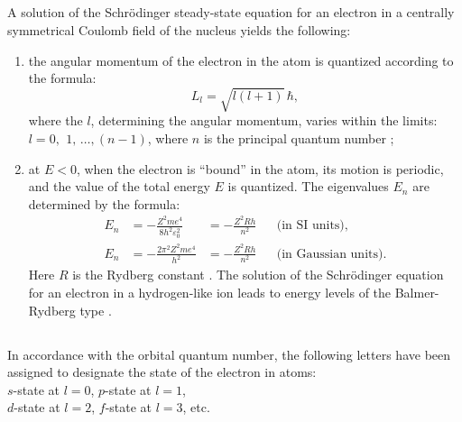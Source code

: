 \subsection{}\label{39.1.8} A solution of the Schr\"odinger steady-state equation for an electron in a centrally symmetrical Coulomb field of the nucleus yields the following:
\begin{enumerate}[label=(\alph*)]
\item the angular momentum of the electron in the atom is quantized according to the formula:
\begin{equation*}%
L_{l} = \sqrt{l(l + 1)} \, \hbar,
\end{equation*}
where the  $l$, determining the angular momentum, varies within the limits: $l = 0,\,\ 1,\, \ldots{}, (n - 1)$, where $n$ is the principal quantum number ;
\item at $E < 0$, when the electron is ``bound'' in the atom, its motion is periodic, and the value of the total energy $E$ is quantized. The eigenvalues $E_{n}$  are determined by the formula:
\begin{align*}%
E_{n} & = - \frac{Z^{2}me^{4}}{8 h^{2} \varepsilon_{0}^{2}} & = - \frac{Z^{2}R h }{n^{2}} && \text{(in SI units)},\\
E_{n} & = - \frac{2 \pi^{2} Z^{2}me^{4}}{h^{2}} & = - \frac{Z^{2}R h }{n^{2}} && \text{(in Gaussian units).}
\end{align*}
Here $R$ is the Rydberg constant . The solution of the Schr\"odinger equation for an electron in a hydrogen-like ion leads to energy levels of the Balmer-Rydberg type .
\end{enumerate}
\subsection{}\label{39.1.9} In accordance with the orbital quantum number, the following letters have been assigned to designate the state of the electron in atoms:\\
$s$-state at $l = 0$, $p$-state at $l = 1$,\\
$d$-state at $l = 2$, $f$-state at $l = 3$, etc.

